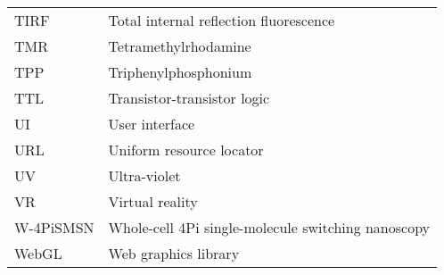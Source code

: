 \begin{flushleft}
\begin{longtable}[l]{|p{5.5em}|p{25em}|}
TIRF       & Total internal reflection fluorescence                     \\
TMR        & Tetramethylrhodamine                                       \\
TPP        & Triphenylphosphonium                                       \\
TTL        & Transistor-transistor logic                                \\
UI         & User interface                                             \\
URL        & Uniform resource locator                                   \\
UV         & Ultra-violet                                               \\
VR         & Virtual reality                                            \\
W-4PiSMSN  & Whole-cell 4Pi single-molecule switching nanoscopy         \\
WebGL      & Web graphics library
\\
\hline
\end{longtable}


\end{flushleft}
